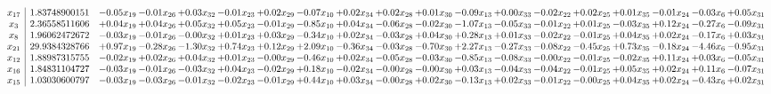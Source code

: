 \documentclass[9pt]{article}
\begin{document}
 \[\begin{array}{c| c c@{\hskip 2pt} c@{\hskip 2pt} c@{\hskip 2pt} c@{\hskip 2pt} c@{\hskip 2pt} c@{\hskip 2pt} c@{\hskip 2pt} c@{\hskip 2pt} c@{\hskip 2pt} c@{\hskip 2pt} c@{\hskip 2pt} c@{\hskip 2pt} c@{\hskip 2pt} c@{\hskip 2pt} c@{\hskip 2pt} c@{\hskip 2pt} c@{\hskip 2pt} }
 x_{17}   &  1.83748900151 & -0.05 x_{19} & -0.01 x_{26} & +  0.03 x_{32} & -0.01 x_{23} & +  0.02 x_{29} & -0.07 x_{10} & +  0.02 x_{34} & +  0.02 x_{28} & +  0.01 x_{30} & -0.09 x_{13} & +  0.00 x_{33} & -0.02 x_{22} & +  0.02 x_{25} & +  0.01 x_{35} & -0.01 x_{24} & -0.03 x_{6} & +  0.05 x_{31}\\
 x_{3}   &  2.36558511606 & +  0.04 x_{19} & +  0.04 x_{26} & +  0.05 x_{32} & +  0.05 x_{23} & -0.01 x_{29} & -0.85 x_{10} & +  0.04 x_{34} & -0.06 x_{28} & -0.02 x_{30} & -1.07 x_{13} & -0.05 x_{33} & -0.01 x_{22} & +  0.01 x_{25} & -0.03 x_{35} & +  0.12 x_{24} & -0.27 x_{6} & -0.09 x_{31}\\
 x_{8}   &  1.96062472672 & -0.03 x_{19} & -0.01 x_{26} & -0.00 x_{32} & +  0.01 x_{23} & +  0.03 x_{29} & -0.34 x_{10} & +  0.02 x_{34} & -0.03 x_{28} & +  0.04 x_{30} & +  0.28 x_{13} & +  0.01 x_{33} & -0.02 x_{22} & -0.01 x_{25} & +  0.04 x_{35} & +  0.02 x_{24} & -0.17 x_{6} & +  0.03 x_{31}\\
 x_{21}   &  29.9384328766 & +  0.97 x_{19} & -0.28 x_{26} & -1.30 x_{32} & +  0.74 x_{23} & +  0.12 x_{29} & +  2.09 x_{10} & -0.36 x_{34} & -0.03 x_{28} & -0.70 x_{30} & +  2.27 x_{13} & -0.27 x_{33} & -0.08 x_{22} & -0.45 x_{25} & +  0.73 x_{35} & -0.18 x_{24} & -4.46 x_{6} & -0.95 x_{31}\\
 x_{12}   &  1.88987315755 & -0.02 x_{19} & +  0.02 x_{26} & +  0.04 x_{32} & +  0.01 x_{23} & -0.00 x_{29} & -0.46 x_{10} & +  0.02 x_{34} & -0.05 x_{28} & -0.03 x_{30} & -0.85 x_{13} & -0.08 x_{33} & -0.00 x_{22} & -0.01 x_{25} & -0.02 x_{35} & +  0.11 x_{24} & +  0.03 x_{6} & -0.05 x_{31}\\
 x_{16}   &  1.84831104727 & -0.03 x_{19} & -0.01 x_{26} & -0.03 x_{32} & +  0.04 x_{23} & -0.02 x_{29} & +  0.18 x_{10} & -0.02 x_{34} & -0.00 x_{28} & -0.00 x_{30} & +  0.03 x_{13} & -0.04 x_{33} & -0.04 x_{22} & -0.01 x_{25} & +  0.05 x_{35} & +  0.02 x_{24} & +  0.11 x_{6} & -0.07 x_{31}\\
 x_{15}   &  1.03030600797 & -0.03 x_{19} & -0.03 x_{26} & -0.01 x_{32} & -0.02 x_{23} & -0.01 x_{29} & +  0.44 x_{10} & +  0.03 x_{34} & -0.00 x_{28} & +  0.02 x_{30} & -0.13 x_{13} & +  0.02 x_{33} & -0.01 x_{22} & -0.00 x_{25} & +  0.04 x_{35} & +  0.02 x_{24} & -0.43 x_{6} & +  0.02 x_{31}\\

\end{array}\]
\end{document}
